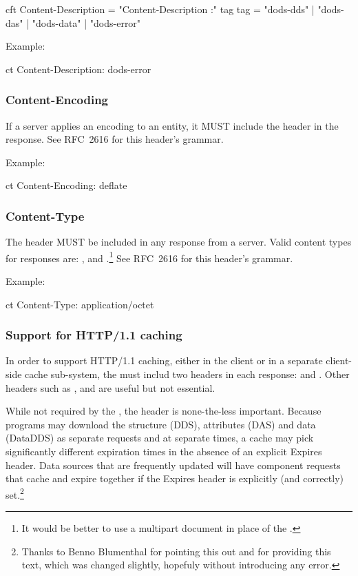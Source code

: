 \documentclass[justify]{nasa-ese}
\begin{document}
\begin{vcode}{cft}
Content-Description = "Content-Description :" tag 
tag                 = "dods-dds" | "dods-das" | "dods-data" | "dods-error" 
\end{vcode}

Example:
\begin{vcode}{ct}
Content-Description: dods-error
\end{vcode}

\subsubsection{Content-Encoding}
\label{content-encoding}
If a \DAP server applies an encoding to an entity, it MUST include the
 header in the response. See RFC~2616\cite{rfc2616}
for this header's grammar.

Example:
\begin{vcode}{ct}
Content-Encoding: deflate
\end{vcode}

\subsubsection{Content-Type}
The  header MUST be included in any response from a
\DAP server. Valid content types for \DAP responses are:
,  and
.\footnote{It would be better to use a multipart
  document in place of the .} See RFC~2616\cite{rfc2616} for this header's grammar.

Example:
\begin{vcode}{ct}
Content-Type: application/octet
\end{vcode}


\subsubsection{Support for HTTP/1.1 caching}
\label{sec-http-caching}

In order to support HTTP/1.1 caching, either in the client or in a
separate client-side cache sub-system, the \DAP must includ two
headers in each response:  and . Other
headers such as ,  and  are
useful but not essential. 

While not required by the \DAP, the  header is
none-the-less important. Because programs may download the structure
(DDS), attributes (DAS) and data (DataDDS) as separate requests and at
separate times, a cache may pick significantly different expiration
times in the absence of an explicit Expires header. Data sources that
are frequently updated will have \DAP component requests that cache
and expire together if the Expires header is explicitly (and
correctly) set.\footnote{Thanks to Benno Blumenthal for pointing this
  out and for providing this text, which was changed slightly,
  hopefuly without introducing any error.}
\end{document}

